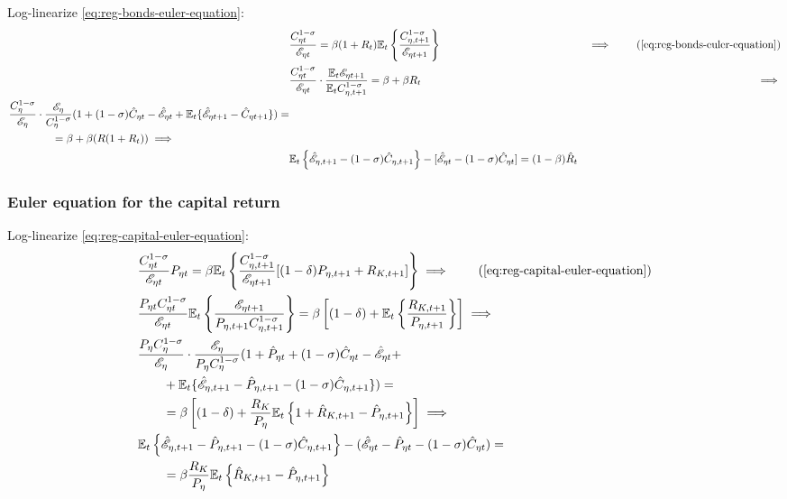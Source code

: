 \documentclass[../thesis.tex]{subfiles}
\begin{document}
Log-linearize \ref{eq:reg-bonds-euler-equation}:
\begin{alignat}{2}
	& \frac{ C_{\eta t}^{1-\sigma}}{ \te} = \beta (1 + R_{t}) \E \left\{ \frac{ C_{\eta, t+1}^{1-\sigma}}{ \te[t+1]} \right\} &\implies \tag{\ref{eq:reg-bonds-euler-equation}}\\
	& \frac{ C_{\eta t}^{1-\sigma}}{\te} \cdot \frac{\E \te[t+1]}{\E C_{\eta, t+1}^{1-\sigma}} = \beta + \beta R_{t} &\implies \nonumber \\
	\begin{split}
		& \frac{C_{\eta}^{1-\sigma}}{\te[]} \cdot \frac{\te[]}{C_{\eta}^{1-\sigma}} (1 + (1-\sigma) \hat{C}_{\eta t} - \hat{\mathscr{E}}_{\eta t} + \E \{ \hat{\mathscr{E}}_{\eta t+1} - \hat{C}_{\eta t+1} \}) = \\ & \qquad \qquad = \beta + \beta (R(1 + R_{t})) \implies
	\end{split} \nonumber \\
	& \E \left\{ \hat{\mathscr{E}}_{\eta, t+1} - (1 -\sigma)\hat{C}_{\eta, t+1} \right\} - [\hat{\mathscr{E}}_{\eta t} - (1 -\sigma)\hat{C}_{\eta t}] = (1 -\beta) \hat{R}_{t} \label{eq:reg-ll-bonds-euler-equation}
\end{alignat}


\subsubsection*{Euler equation for the capital return}

Log-linearize \ref{eq:reg-capital-euler-equation}:
	\begin{alignat}{2}
		& \frac{ C_{\eta t}^{1-\sigma}}{ \te} P_{\eta t} = \beta \mathbb{E}_t \left\{ \frac{ C_{\eta, t+1}^{1-\sigma}}{ \te[t+1]} [(1-\delta) P_{\eta, t+1} + R_{K,t+1}] \right\} \implies \tag{\ref{eq:reg-capital-euler-equation}} \\
		& \frac{P_{\eta t} C_{\eta t}^{1-\sigma}}{\te} \mathbb{E}_t \left\{ \frac{\te[t+1]}{P_{\eta, t+1} C_{\eta, t+1}^{1-\sigma}} \right\} = \beta \left[ (1-\delta) + \mathbb{E}_t \left\{ \frac{R_{K,t+1}}{P_{\eta, t+1}} \right\} \right] \implies \nonumber \\
		& \frac{P_{\eta} C_{\eta}^{1-\sigma}}{\te[]} \cdot \frac{\te[]}{P_{\eta} C_{\eta}^{1-\sigma}} (1 + \hat{P}_{\eta t} + (1 -\sigma) \hat{C}_{\eta t} - \hat{\mathscr{E}}_{\eta t} + \nonumber \\ 
		& \qquad + \E \{\hat{\mathscr{E}}_{\eta, t+1} - \hat{P}_{\eta, t+1} - (1 -\sigma) \hat{C}_{\eta, t+1}\}) = \nonumber \\
		& \qquad = \beta \left[ (1-\delta) + \frac{R_{K}}{P_{\eta}} \mathbb{E}_t \left\{ 1 + \hat{R}_{K, t+1} -\hat{P}_{\eta, t+1} \right\} \right] \implies \nonumber \\
		& \E \left\{ \hat{\mathscr{E}}_{\eta, t+1} - \hat{P}_{\eta, t+1}  - (1 -\sigma) \hat{C}_{\eta, t+1} \right\} - (\hat{\mathscr{E}}_{\eta t} - \hat{P}_{\eta t} - (1 -\sigma) \hat{C}_{\eta t}) = \nonumber \\
		& \qquad = \beta \frac{R_{K}}{P_{\eta}} \mathbb{E}_t \left\{ \hat{R}_{K, t+1} - \hat{P}_{\eta, t+1} \right\} \label{eq:reg-ll-capital-euler-equation}
	\end{alignat}
	
\end{document}

